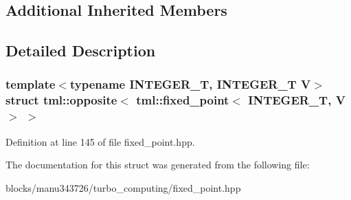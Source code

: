 \subsection*{Additional Inherited Members}


\subsection{Detailed Description}
\subsubsection*{template$<$typename I\+N\+T\+E\+G\+E\+R\+\_\+\+T, I\+N\+T\+E\+G\+E\+R\+\_\+\+T V$>$struct tml\+::opposite$<$ tml\+::fixed\+\_\+point$<$ I\+N\+T\+E\+G\+E\+R\+\_\+\+T, V $>$ $>$}



Definition at line 145 of file fixed\+\_\+point.\+hpp.



The documentation for this struct was generated from the following file\+:\begin{DoxyCompactItemize}
\item 
blocks/manu343726/turbo\+\_\+computing/fixed\+\_\+point.\+hpp\end{DoxyCompactItemize}
